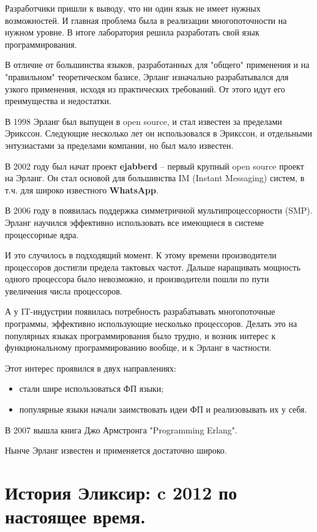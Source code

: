 Разработчики пришли к выводу, что ни один язык не имеет нужных возможностей. И главная проблема была в реализации многопоточности на нужном уровне. В итоге лаборатория решила разработать свой язык программирования.

В отличие от большинства языков, разработанных для "общего" применения и на "правильном" теоретическом базисе, Эрланг изначально разрабатывался для узкого применения, исходя из практических требований. От этого идут его преимущества и недостатки.

В 1998 Эрланг был выпущен в open source, и стал известен за пределами Эрикссон. Следующие несколько лет он использовался в Эрикссон, и отдельными энтузиастами за пределами компании, но был мало известен.

В 2002 году был начат проект \textbf{ejabberd} -- первый крупный open source проект на Эрланг. Он стал основой для большинства IM (Instant Messaging) систем, в т.ч. для широко известного \textbf{WhatsApp}.

В 2006 году в появилась поддержка симметричной мультипроцессорности (SMP). Эрланг научился эффективно использовать все имеющиеся в системе процессорные ядра.

И это случилось в подходящий момент. К этому времени производители процессоров достигли предела тактовых частот. Дальше наращивать мощность одного процессора было невозможно, и производители пошли по пути увеличения числа процессоров.

А у IT-индустрии появилась потребность разрабатывать многопоточные программы, эффективно использующие несколько процессоров. Делать это на популярных языках программирования было трудно, и возник интерес к функциональному программированию вообще, и к Эрланг в частности.

Этот интерес проявился в двух направлениях:
\begin{itemize}
\item стали шире использоваться ФП языки;
\item популярные языки начали заимствовать идеи ФП и реализовывать их у себя.
\end{itemize}

В 2007 вышла книга Джо Армстронга "Programming Erlang".

Нынче Эрланг известен и применяется достаточно широко.

\section{История Эликсир: c 2012 по настоящее время.}

